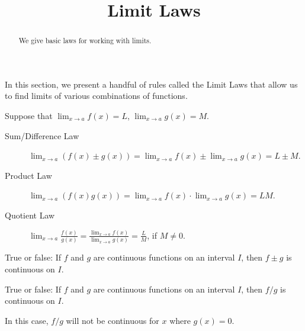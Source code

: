 \documentclass{ximera}
\title[Dig-In:]{Limit Laws}
\begin{document}
\begin{abstract}
We give basic laws for working with limits. 
\end{abstract}
\maketitle


In this section, we present a handful of rules called the Limit Laws that allow us to find limits of various combinations of functions.  

\begin{theorem}\label{theorem:limit-laws}
Suppose that $\lim_{x\to a}f(x)=L$, $\lim_{x\to a}g(x)=M$.
\begin{description}
\item[Sum/Difference Law] $\lim_{x\to a} (f(x) \pm g(x)) =
  \lim_{x\to a}f(x) \pm \lim_{x\to a}g(x)=L \pm M$.
\item[Product Law]  $\lim_{x\to a} (f(x)g(x)) = \lim_{x\to
  a}f(x)\cdot\lim_{x\to a}g(x)=LM$.
\item[Quotient Law]  $\lim_{x\to a} \frac{f(x)}{g(x)} =
  \frac{\lim_{x\to a}f(x)}{\lim_{x\to a}g(x)}=\frac{L}{M}$, if
  $M\ne0$.
\end{description}
\label{thm:limit laws}
\end{theorem}

\begin{question}
  True or false: If $f$ and $g$ are continuous functions on an
  interval $I$, then $f\pm g$ is continuous on $I$.
  \begin{multipleChoice}
  \end{multipleChoice}
\end{question}

\begin{question}
  True or false: If $f$ and $g$ are continuous functions on an
  interval $I$, then $f/g$ is continuous on $I$.
  \begin{multipleChoice}
  \end{multipleChoice}
  \begin{feedback}
    In this case, $f/g$ will not be continuous for $x$ where $g(x) =
    0$.
  \end{feedback}
\end{question}
\end{document}
